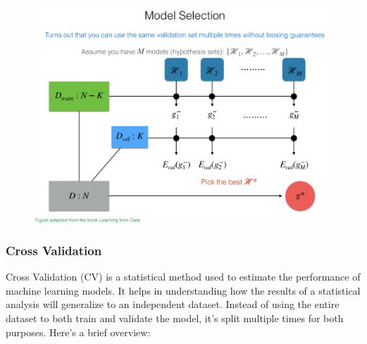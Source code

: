 \documentclass{article}
\begin{document}
\begin{figure}[h]
\centering
\includegraphics[width=16cm]{3.3.1_Model.png}
\end{figure}

\subsubsection{Cross Validation}
Cross Validation (CV) is a statistical method used to estimate the performance of machine learning models. It helps in understanding how the results of a statistical analysis will generalize to an independent dataset. Instead of using the entire dataset to both train and validate the model, it's split multiple times for both purposes. Here's a brief overview:
\end{document}
